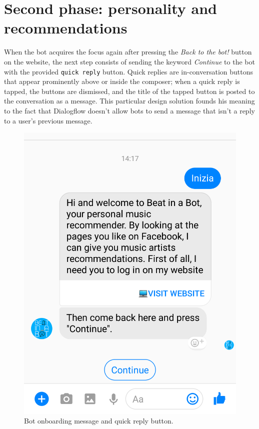 \documentclass[b5paper,10pt,twoside,cucitura]{toptesi}
\begin{document}
\section{Second phase: personality and recommendations}

When the bot acquires the focus again after pressing the \textit{Back to the bot!} button on the website, the next step consists of sending the keyword \textit{Continue} to the bot with the provided \texttt{quick reply} button. Quick replies are in-conversation buttons that appear prominently above or inside the composer; when a quick reply is tapped, the buttons are dismissed, and the title of the tapped button is posted to the conversation as a message. This particular design solution founds his meaning to the fact that Dialogflow doesn't allow bots to send a message that isn't a reply to a user's previous message. 

\begin{figure}[ht]
\centering
\includegraphics[scale=0.2]{bot_start.png}
\caption{Bot onboarding message and quick reply button.}
\end{figure}
\end{document}
